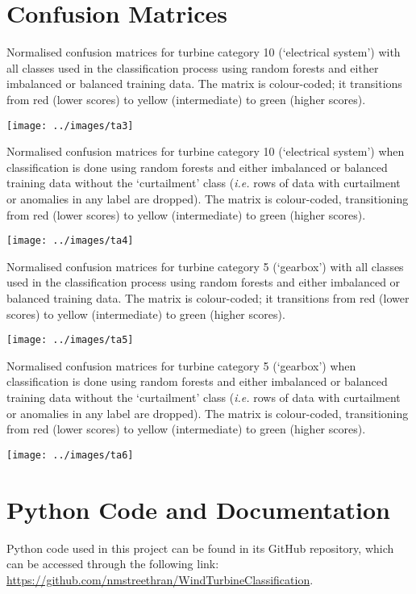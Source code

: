 \chapter{Confusion Matrices}\label{a4}

\begin{table}
  \centering
  \captionsetup{labelformat=empty,list=no}
  \caption{Normalised confusion matrices for turbine category 10 (`electrical
  system') with all classes used in the classification process using random
  forests and either imbalanced or balanced training data. The matrix is
  colour-coded; it transitions from red (lower scores) to yellow
  (intermediate) to green (higher scores).}
  \texttt{[image: ../images/ta3]}
\end{table}

\begin{table}
  \centering
  \captionsetup{labelformat=empty,list=no}
  \caption{Normalised confusion matrices for turbine category 10 (`electrical
  system') when classification is done using random forests and either
  imbalanced or balanced training data without the `curtailment' class (\textit{i.e.}
  rows of data with curtailment or anomalies in any label are dropped). The
  matrix is colour-coded, transitioning from red (lower scores) to yellow
  (intermediate) to green (higher scores).}
  \texttt{[image: ../images/ta4]}
\end{table}

\begin{table}
  \centering
  \captionsetup{labelformat=empty,list=no}
  \caption{Normalised confusion matrices for turbine category 5 (`gearbox')
  with all classes used in the classification process using random forests and
  either imbalanced or balanced training data. The matrix is colour-coded; it
  transitions from red (lower scores) to yellow (intermediate) to green
  (higher scores).}
  \texttt{[image: ../images/ta5]}
\end{table}

\begin{table}
  \centering
  \captionsetup{labelformat=empty,list=no}
  \caption{Normalised confusion matrices for turbine category 5 (`gearbox')
  when classification is done using random forests and either imbalanced or
  balanced training data without the `curtailment' class (\textit{i.e.} rows of data
  with curtailment or anomalies in any label are dropped). The matrix is
  colour-coded, transitioning from red (lower scores) to yellow (intermediate)
  to green (higher scores).}
  \texttt{[image: ../images/ta6]}
\end{table}

\chapter{Python Code and Documentation}\label{a5}

Python code used in this project can be found in its GitHub repository, which
can be accessed through the following link:
\url{https://github.com/nmstreethran/WindTurbineClassification}.
